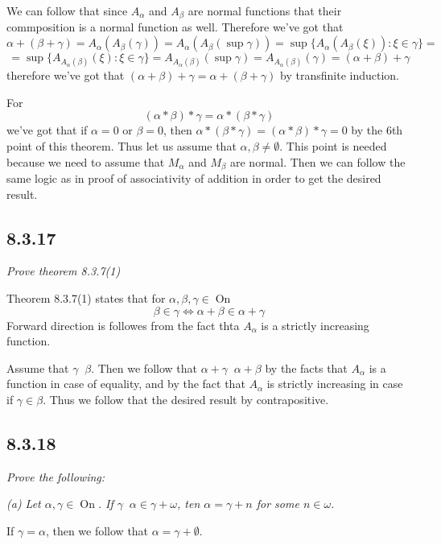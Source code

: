 \documentclass[11pt,oneside,titlepage]{book}
\DeclareMathOperator \lra {\Leftrightarrow}
\DeclareMathOperator \On {On}
\DeclareMathOperator \ineq {\underline{\in}}
\newcommand{\set}[1]{\{ #1 \}}
\begin{document}
We can follow that since $A_\alpha$ and $A_\beta$ are normal functions that
their commposition is a normal function as well. Therefore we've got that
$$\alpha + (\beta + \gamma) = A_\alpha(A_\beta( \gamma)) =
A_\alpha(A_\beta( \sup \gamma)) = \sup  \set{A_\alpha(A_\beta(\xi)): \xi \in \gamma} =$$
$$ = 
\sup  \set{A_{A_\alpha(\beta)} (\xi): \xi \in \gamma} = A_{A_\alpha(\beta)} (\sup \gamma) =
A_{A_\alpha(\beta)} (\gamma) = (\alpha + \beta) + \gamma$$
therefore we've got that $(\alpha + \beta) + \gamma = \alpha + (\beta + \gamma)$
by transfinite induction.

For 
$$(\alpha * \beta) * \gamma = \alpha * (\beta * \gamma)$$
we've got that if $\alpha = 0$ or $\beta = 0$, then
$\alpha * (\beta * \gamma) = (\alpha * \beta) * \gamma = 0$
by the 6th point of this theorem. Thus let us assume that $\alpha, \beta \neq \emptyset$.
This point is needed because we need to assume that $M_\alpha$ and $M_\beta$ are normal.
Then we can follow the same logic as in proof of associativity of addition in order to get
the desired result.

\subsection*{8.3.17}

\textit{Prove theorem 8.3.7(1)}

Theorem 8.3.7(1) states that for $\alpha, \beta, \gamma \in \On$
$$\beta \in \gamma \lra \alpha + \beta \in \alpha + \gamma$$
Forward direction is followes from the fact thta $A_\alpha$ is a strictly increasing function.

Assume that $\gamma \ineq \beta$. Then we follow that
$\alpha + \gamma \ineq \alpha + \beta$ by the facts that $A_\alpha$ is a function in case
of equality, and by the fact that $A_\alpha$ is strictly increasing in case if $\gamma \in \beta$.
Thus we follow that the desired result by contrapositive.

\subsection*{8.3.18}

\textit{Prove the following: }

\textit{(a) Let $\alpha, \gamma \in \On$. If $\gamma \ineq \alpha \in \gamma + \omega$,
ten $\alpha = \gamma + n$ for some $n \in \omega$. }

If $\gamma = \alpha$, then we follow that $\alpha = \gamma + \emptyset$.
\end{document}
